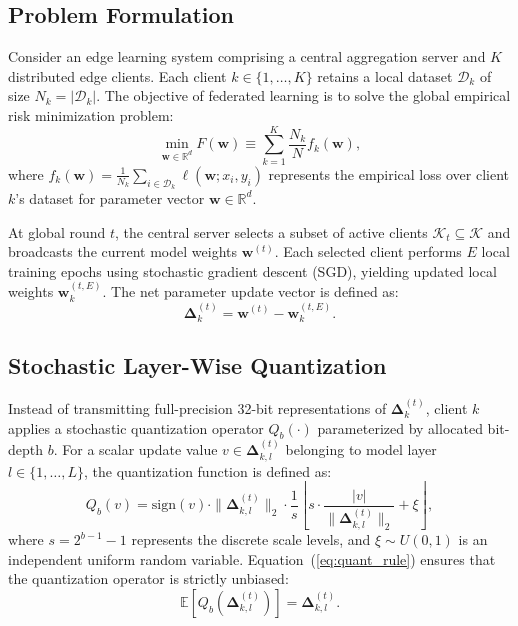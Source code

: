 \documentclass[conference]{IEEEtran}
\begin{document}
\subsection{Problem Formulation}
Consider an edge learning system comprising a central aggregation server and $K$ distributed edge clients. Each client $k \in \{1, \dots, K\}$ retains a local dataset $\mathcal{D}_k$ of size $N_k = |\mathcal{D}_k|$. The objective of federated learning is to solve the global empirical risk minimization problem:
\begin{equation}
\min_{\mathbf{w} \in \mathbb{R}^d} F(\mathbf{w}) \equiv \sum_{k=1}^K \frac{N_k}{N} f_k(\mathbf{w}),
\label{eq:global_obj}
\end{equation}
where $f_k(\mathbf{w}) = \frac{1}{N_k} \sum_{i \in \mathcal{D}_k} \ell(\mathbf{w}; x_i, y_i)$ represents the empirical loss over client $k$'s dataset for parameter vector $\mathbf{w} \in \mathbb{R}^d$.

At global round $t$, the central server selects a subset of active clients $\mathcal{K}_t \subseteq \mathcal{K}$ and broadcasts the current model weights $\mathbf{w}^{(t)}$. Each selected client performs $E$ local training epochs using stochastic gradient descent (SGD), yielding updated local weights $\mathbf{w}_k^{(t, E)}$. The net parameter update vector is defined as:
\begin{equation}
\boldsymbol{\Delta}_k^{(t)} = \mathbf{w}^{(t)} - \mathbf{w}_k^{(t, E)}.
\label{eq:update_vector}
\end{equation}

\subsection{Stochastic Layer-Wise Quantization}
Instead of transmitting full-precision 32-bit representations of $\boldsymbol{\Delta}_k^{(t)}$, client $k$ applies a stochastic quantization operator $Q_b(\cdot)$ parameterized by allocated bit-depth $b$. For a scalar update value $v \in \boldsymbol{\Delta}_{k, l}^{(t)}$ belonging to model layer $l \in \{1, \dots, L\}$, the quantization function is defined as:
\begin{equation}
Q_b(v) = \text{sign}(v) \cdot \|\boldsymbol{\Delta}_{k, l}^{(t)}\|_2 \cdot \frac{1}{s} \left\lfloor s \cdot \frac{|v|}{\|\boldsymbol{\Delta}_{k, l}^{(t)}\|_2} + \xi \right\rfloor,
\label{eq:quant_rule}
\end{equation}
where $s = 2^{b-1} - 1$ represents the discrete scale levels, and $\xi \sim U(0, 1)$ is an independent uniform random variable. Equation~(\ref{eq:quant_rule}) ensures that the quantization operator is strictly unbiased:
\begin{equation}
\mathbb{E}\left[ Q_b(\boldsymbol{\Delta}_{k, l}^{(t)}) \right] = \boldsymbol{\Delta}_{k, l}^{(t)}.
\label{eq:unbiased}
\end{equation}
\end{document}
